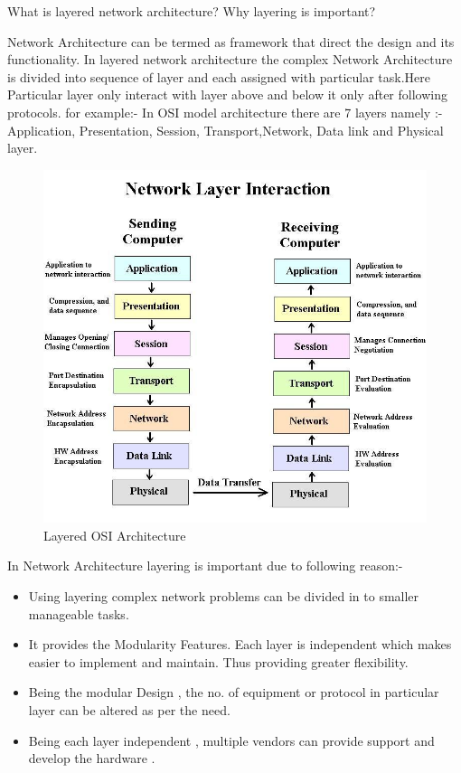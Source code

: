 \documentclass[a4paper,12pt]{article}
\begin{document}
\begin{Q}
{
    What is layered network architecture? Why layering is important?
}
\end{Q}

\begin{A}
    {
        Network Architecture can be termed as framework that direct the design and its functionality. 
        In layered network architecture the complex Network Architecture is divided into sequence of layer 
        and each assigned with particular task.Here Particular layer only interact with layer above and below it only after following protocols.
         for example:- In OSI model architecture there are 7 layers  namely :- 
        Application, Presentation, Session, Transport,Network, Data link and Physical layer.

        \begin{figure}[H]
            \centering
            \includegraphics[scale=0.55,cframe=blue 0.5pt 3pt]{layers.jpg}
            \caption{Layered OSI Architecture}
        \end{figure}

        In Network Architecture layering is important due to following reason:-
        \begin{itemize}
            \item Using layering complex network problems can be divided in to smaller manageable tasks.
            \item It provides the Modularity Features. Each layer is independent which makes easier to implement and maintain.
            Thus providing greater  flexibility.
            \item Being the modular Design , the no. of equipment or protocol in particular layer can be altered as per the need.
            \item Being each layer independent , multiple vendors can provide support and develop the hardware .
        \end{itemize}

    }
\end{A}
\end{document}
